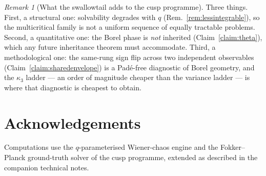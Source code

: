 \documentclass[11pt,reqno]{amsart}
\theoremstyle{plain}
\theoremstyle{definition}
\theoremstyle{remark}
\newtheorem{remark}[theorem]{Remark}
\begin{document}
\begin{remark}[What the swallowtail adds to the cusp programme]
Three things. First, a structural one: solvability degrades with $q$
(Rem.~\ref{rem:lessintegrable}), so the multicritical family is not a uniform sequence of
equally tractable problems. Second, a quantitative one: the Borel phase is \emph{not} inherited
(Claim~\ref{claim:theta}), which any future inheritance theorem must accommodate. Third, a
methodological one: the same-rung sign flip across two independent observables
(Claim~\ref{claim:sharedenvelope}) is a Pad\'e-free diagnostic of Borel geometry, and the
$\kappa_3$ ladder --- an order of magnitude cheaper than the variance ladder --- is where that
diagnostic is cheapest to obtain.
\end{remark}

\section*{Acknowledgements}
Computations use the $q$-parameterised Wiener-chaos engine and the Fokker--Planck ground-truth
solver of the cusp programme, extended as described in the companion technical notes.
\end{document}
